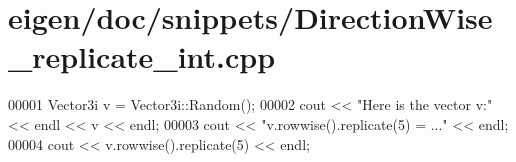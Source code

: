 \hypertarget{eigen_2doc_2snippets_2_direction_wise__replicate__int_8cpp_source}{}\section{eigen/doc/snippets/\+Direction\+Wise\+\_\+replicate\+\_\+int.cpp}
\label{eigen_2doc_2snippets_2_direction_wise__replicate__int_8cpp_source}

\begin{DoxyCode}
00001 Vector3i v = Vector3i::Random();
00002 cout << \textcolor{stringliteral}{"Here is the vector v:"} << endl << v << endl;
00003 cout << \textcolor{stringliteral}{"v.rowwise().replicate(5) = ..."} << endl;
00004 cout << v.rowwise().replicate(5) << endl;
\end{DoxyCode}
